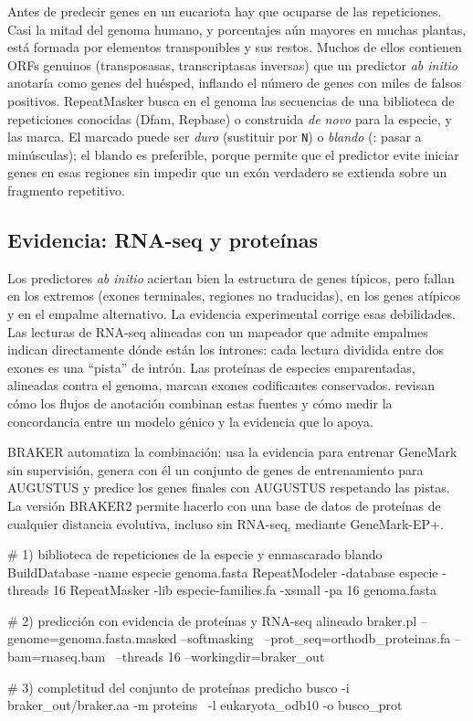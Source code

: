 Antes de predecir genes en un eucariota hay que ocuparse de las repeticiones. Casi la mitad del genoma humano, y porcentajes aún mayores en muchas plantas, está formada por elementos transponibles y sus restos. Muchos de ellos contienen ORFs genuinos (transposasas, transcriptasas inversas) que un predictor \emph{ab initio} anotaría como genes del huésped, inflando el número de genes con miles de falsos positivos. RepeatMasker \parencite{c08-tarailo2009} busca en el genoma las secuencias de una biblioteca de repeticiones conocidas (Dfam, Repbase) o construida \emph{de novo} para la especie, y las marca. El marcado puede ser \emph{duro} (sustituir por \texttt{N}) o \emph{blando} (: pasar a minúsculas); el blando es preferible, porque permite que el predictor evite iniciar genes en esas regiones sin impedir que un exón verdadero se extienda sobre un fragmento repetitivo.

\subsection{Evidencia: RNA-seq y proteínas}

Los predictores \emph{ab initio} aciertan bien la estructura de genes típicos, pero fallan en los extremos (exones terminales, regiones no traducidas), en los genes atípicos y en el empalme alternativo. La evidencia experimental corrige esas debilidades. Las lecturas de RNA-seq alineadas con un mapeador que admite empalmes indican directamente dónde están los intrones: cada lectura dividida entre dos exones es una ``pista'' de intrón. Las proteínas de especies emparentadas, alineadas contra el genoma, marcan exones codificantes conservados. \textcite{c08-yandell2012} revisan cómo los flujos de anotación combinan estas fuentes y cómo medir la concordancia entre un modelo génico y la evidencia que lo apoya.

BRAKER automatiza la combinación: usa la evidencia para entrenar GeneMark sin supervisión, genera con él un conjunto de genes de entrenamiento para AUGUSTUS y predice los genes finales con AUGUSTUS respetando las pistas. La versión BRAKER2 \parencite{c08-bruna2021} permite hacerlo con una base de datos de proteínas de cualquier distancia evolutiva, incluso sin RNA-seq, mediante GeneMark-EP+.

\begin{consola}
# 1) biblioteca de repeticiones de la especie y enmascarado blando
BuildDatabase -name especie genoma.fasta
RepeatModeler -database especie -threads 16
RepeatMasker -lib especie-families.fa -xsmall -pa 16 genoma.fasta

# 2) predicción con evidencia de proteínas y RNA-seq alineado
braker.pl --genome=genoma.fasta.masked --softmasking \
    --prot_seq=orthodb_proteinas.fa --bam=rnaseq.bam \
    --threads 16 --workingdir=braker_out

# 3) completitud del conjunto de proteínas predicho
busco -i braker_out/braker.aa -m proteins \
    -l eukaryota_odb10 -o busco_prot
\end{consola}

